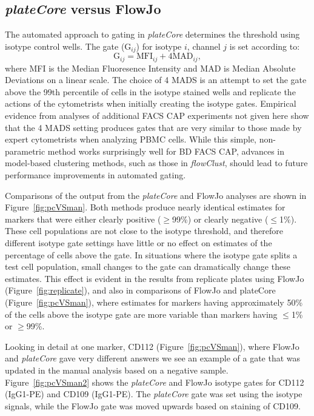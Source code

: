 \documentclass[12pt]{article}
\newcommand{\Rpackage}[1]{{\textit{#1}}}
\begin{document}
\subsection*{\Rpackage{plateCore} versus FlowJo}
The automated approach to gating in \Rpackage{plateCore} determines the
threshold using isotype control wells. The gate (G$_{ij}$) for isotype $i$,
channel $j$ is set according to:
\begin{equation}
\text{G}_{ij} = \text{MFI}_{ij} + 4 \text{MAD}_{ij},
\label{isoGate}
\end{equation}
where MFI is the Median Fluoresence Intensity and MAD is Median Absolute
Deviations on a linear scale. The choice of 4 MADS is an attempt to set the
gate above the 99th percentile of cells in the isotype stained wells and
replicate the actions of the cytometrists when initially creating the isotype
gates. Empirical evidence from analyses of additional FACS CAP experiments not
given here show that the 4 MADS setting produces gates that are very
similar to those made by expert cytometrists when analyzing PBMC cells. While
this simple, non-parametric method works surprisingly well for BD FACS CAP,
advances in model-based clustering methods, such as those in
\Rpackage{flowClust}, should lead to future performance improvements in
automated gating.

Comparisons of the output from the \Rpackage{plateCore} and FlowJo analyses are
shown in Figure~\ref{fig:pcVSman}. Both methods produce nearly identical
estimates for markers that were either clearly positive ($\ge$99\%) or clearly
negative ($\le$1\%). These cell populations are not close to the isotype
threshold, and therefore different isotype gate settings have little or no
effect on estimates of the percentage of cells above the gate. In situations
where the isotype gate splits a test cell population, small changes to the gate
can dramatically change these estimates. This
effect is evident in the results from replicate plates using FlowJo
(Figure~\ref{fig:replicate}), and also in comparisons of FlowJo and plateCore
(Figure~\ref{fig:pcVSman}), where estimates for markers having approximately
50\% of the cells above the isotype gate are more variable than markers having
$\le$1\% or $\ge$99\%.

Looking in detail at one marker, CD112 (Figure~\ref{fig:pcVSman}), where FlowJo
and \Rpackage{plateCore} gave very different answers we see an example of a
gate that was updated in the manual analysis based on a negative sample.
Figure~\ref{fig:pcVSman2} shows the \Rpackage{plateCore} and FlowJo isotype
gates for CD112 (IgG1-PE) and CD109 (IgG1-PE). The \Rpackage{plateCore} gate was
set using the isotype signals, while the FlowJo gate was moved upwards based
on staining of CD109. 
\end{document}
